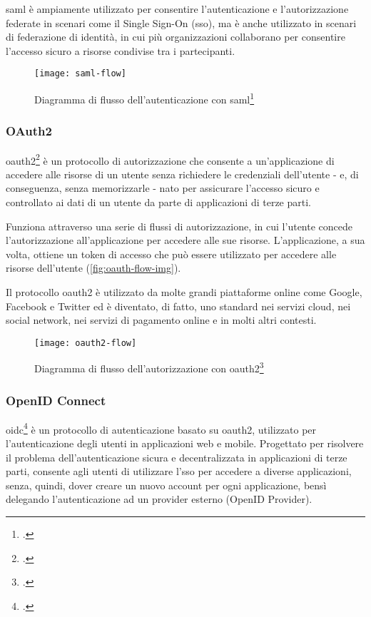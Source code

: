 \acrshort{saml} è ampiamente utilizzato per consentire l'autenticazione e l'autorizzazione federate in scenari come il Single Sign-On (\acrshort{sso}), ma è anche utilizzato in scenari di federazione di identità, in cui più organizzazioni collaborano per consentire l'accesso sicuro a risorse condivise tra i partecipanti.

\begin{figure}[!h] 
    \centering 
    \texttt{[image: saml-flow]} 
    \caption{Diagramma di flusso dell'autenticazione con \acrshort{saml}\footcite{site:saml-flow}}
    \label{fig:saml-flow}
\end{figure}

\subsubsection{OAuth2}
\acrshort{oauth2}\footcite{site:what-is-oauth} è un protocollo di autorizzazione che consente a un'applicazione di accedere alle risorse di un utente senza richiedere le credenziali dell'utente - e, di conseguenza, senza memorizzarle - nato per assicurare l'accesso sicuro e controllato ai dati di un utente da parte di applicazioni di terze parti.

Funziona attraverso una serie di flussi di autorizzazione, in cui l'utente concede l'autorizzazione all'applicazione per accedere alle sue risorse. L'applicazione, a sua volta, ottiene un token di accesso che può essere utilizzato per accedere alle risorse dell'utente (\autoref{fig:oauth-flow-img}).

Il protocollo \acrshort{oauth2} è utilizzato da molte grandi piattaforme online come Google, Facebook e Twitter ed è diventato, di fatto, uno standard nei servizi cloud, nei social network, nei servizi di pagamento online e in molti altri contesti.

\begin{figure}[!h] 
    \centering 
    \texttt{[image: oauth2-flow]} 
    \caption{Diagramma di flusso dell'autorizzazione con \acrshort{oauth2}\footcite{site:oauth-flow-img}}
    \label{fig:oauth-flow-img}
\end{figure}
\subsubsection{OpenID Connect}
\acrshort{oidc}\footcite{site:oidc} è un protocollo di autenticazione basato su \acrshort{oauth2}, utilizzato per l'autenticazione degli utenti in applicazioni web e mobile. Progettato per risolvere il problema dell'autenticazione sicura e decentralizzata in applicazioni di terze parti, consente agli utenti di utilizzare l'\acrshort{sso} per accedere a diverse applicazioni, senza, quindi, dover creare un nuovo account per ogni applicazione, bensì delegando l'autenticazione ad un provider esterno (OpenID Provider).

